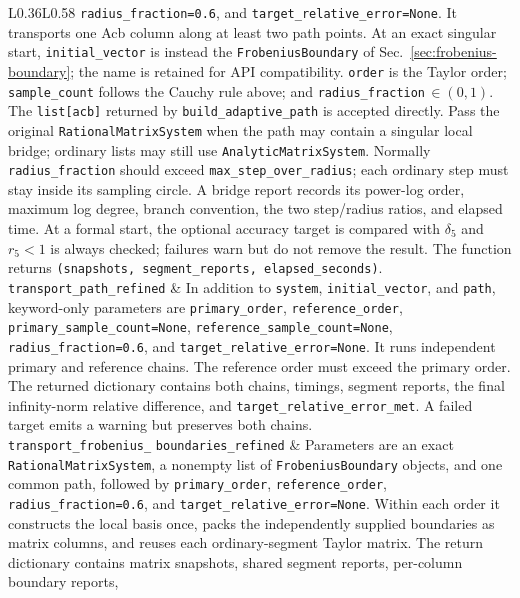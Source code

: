 \documentclass[11pt]{article}
\begin{document}
\begin{longtable}{L{0.36\textwidth}L{0.58\textwidth}}
\texttt{radius\_fraction=0.6}, and \texttt{target\_relative\_error=None}.  It transports one Acb column along at least two path points.
At an exact singular start, \texttt{initial\_vector} is instead the
\texttt{FrobeniusBoundary} of Sec.~\ref{sec:frobenius-boundary}; the name is retained for API
compatibility.
\texttt{order} is the Taylor
order; \texttt{sample\_count} follows the Cauchy rule above; and
\texttt{radius\_fraction}\,$\in(0,1)$.  The \texttt{list[acb]} returned by
\texttt{build\_adaptive\_path} is accepted directly.  Pass the original
\texttt{RationalMatrixSystem} when the path may contain a singular local bridge; ordinary
lists may still use \texttt{AnalyticMatrixSystem}.  Normally \texttt{radius\_fraction}
should exceed \texttt{max\_step\_over\_radius}; each ordinary step must stay inside its
sampling circle.  A bridge report records its power-log order, maximum log degree, branch
convention, the two step/radius ratios, and elapsed time.  At a formal start, the optional
accuracy target is compared with $\delta_5$ and $r_5<1$ is always checked; failures warn but
do not remove the result.  The function returns
\texttt{(snapshots, segment\_reports, elapsed\_seconds)}. \\
\texttt{transport\_path\_refined} & In addition to \texttt{system},
\texttt{initial\_vector}, and \texttt{path}, keyword-only parameters are
\texttt{primary\_order}, \texttt{reference\_order},
\texttt{primary\_sample\_count=None}, \texttt{reference\_sample\_count=None},
\texttt{radius\_fraction=0.6}, and \texttt{target\_relative\_error=None}.  It runs independent primary and reference chains.
The reference order must exceed the primary order.  The returned dictionary contains both
chains, timings, segment reports, the final infinity-norm relative difference, and
\texttt{target\_relative\_error\_met}.  A failed target emits a warning but preserves both chains. \\
\texttt{transport\_frobenius\_}\newline
\texttt{boundaries\_refined} & Parameters are an exact
\texttt{RationalMatrixSystem}, a nonempty list of \texttt{FrobeniusBoundary} objects, and
one common path, followed by \texttt{primary\_order}, \texttt{reference\_order},
\texttt{radius\_fraction=0.6}, and \texttt{target\_relative\_error=None}.  Within each
order it constructs the local basis once, packs the independently supplied boundaries as
matrix columns, and reuses each ordinary-segment Taylor matrix.  The return dictionary
contains matrix snapshots, shared segment reports, per-column boundary reports,

\end{longtable}
\end{document}
